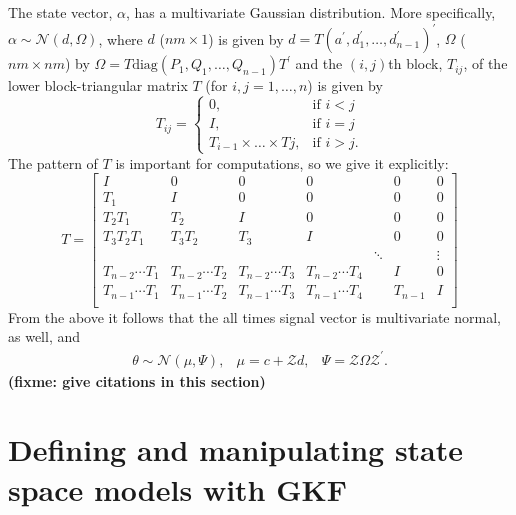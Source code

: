 \documentclass{article}
\begin{document}
The state vector, $\alpha$, has a multivariate Gaussian distribution. More specifically,
$\alpha \sim \mathcal{N}(d,\Omega)$, where $d$ ($ nm \times 1 $) is given by
$d=T(a^\prime,d_1^\prime,\dots,d_{n-1}^\prime)^\prime $, $\Omega$ ($ nm \times nm $) by
$\Omega=T\text{diag}(P_1,Q_1,\dots,Q_{n-1})T^{\prime} $ and the $(i,j)$th block, $T_{ij}$, of
the lower block-triangular matrix $T$ (for $i,j=1,\dots,n$) is given by
\begin{equation}
T_{ij} = \begin{cases}
  0, & \mbox{if } i < j \\
  I, & \mbox{if } i=j \\
  T_{i-1} \times \dots \times Tj, & \mbox{if } i>j.
\end{cases}
\label{eq:Tij}
\end{equation}
The pattern of $T$ is important for computations, so we give it explicitly:
\begin{equation}
  T =
\begin{bmatrix}
  I      & 0   & 0 & 0  &  & 0 & 0 \\
  T_1    & I   & 0 & 0  &  & 0 & 0 \\
  T_2T_1 & T_2 & I & 0  &   & 0 & 0 \\
  T_3T_2T_1 & T_3T_2 & T_3 & I  &   & 0 & 0 \\
         &          &     &    &    \ddots &  & \vdots \\
  T_{n-2} \cdots T_1 & T_{n-2} \cdots T_2 & T_{n-2} \cdots T_3 & T_{n-2} \cdots T_4 & & I & 0 \\
  T_{n-1} \cdots T_1 & T_{n-1} \cdots T_2 & T_{n-1} \cdots T_3 & T_{n-1}  \cdots  T_4 & & T_{n-1} & I \\
\end{bmatrix}
\end{equation}
From the above it follows that the
all times signal vector  is multivariate normal, as well, and
\begin{equation}
  \begin{array}{rcl}
    \theta \sim \mathcal{N}(\mu,\Psi),
    & \mu=c+\mathcal{Z}d,
    & \Psi=\mathcal{Z} \Omega \mathcal{Z}^{\prime}
    .
  \end{array}
  \label{eq:SignalVec}
\end{equation}
\textbf{(fixme: give citations in this section)}



\section{Defining and manipulating state space models with GKF}
\end{document}
